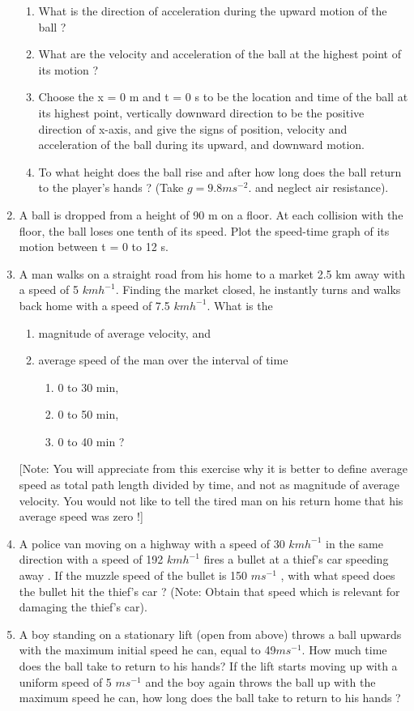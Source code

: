\begin{enumerate}[label=\arabic*.,ref=\thesection.\theenumi]
\begin{enumerate}
\item  What is the direction of acceleration during the upward motion of the ball ? 
\item  What are the velocity and acceleration of the ball at the highest point of its motion ?
\item  Choose the x = 0 m and t = 0 s to be the location and time of the ball at its highest point, vertically downward direction to be the positive direction of x-axis, and give the signs of position, velocity and acceleration of the ball during its upward, and downward motion.
\item  To what height does the ball rise and after how long does the ball return to the player's hands ? (Take $g = 9.8 m s^{-2}$.
and neglect air resistance).
\end{enumerate}
\item  A ball is dropped from a height of 90 m on a floor. At each collision with the floor, the ball loses one tenth of its speed. Plot the speed-time graph of its motion between t = 0 to 12 s.
\item A man walks on a straight road from his home to a market 2.5 km away with a speed of 5 $km h^{-1}$. Finding the market closed, he instantly turns and walks back home with a speed of 7.5 $km h^{-1}$. What is the 
\begin{enumerate}
\item magnitude of average velocity, and 
\item average speed of the man over the interval of time 
\begin{enumerate}
\item 0 to 30 min, 
\item 0 to 50 min, 
\item 0 to 40 min ? 
\end{enumerate}
\end{enumerate}
[Note: You will appreciate from this exercise why it is better to define average speed as total path length divided by time, and not as magnitude of average velocity. You would not like to tell the tired man on his return home that his average speed was zero !]
\item  A police van moving on a highway with a speed of 30 $km h^{-1}$
in the same direction with a speed of 192 $km h^{-1}$ 
fires a bullet at a thief's car speeding away . If the muzzle speed of the bullet is 150 $m s^{-1}$
, with
what speed does the bullet hit the thief's car ? (Note: Obtain that speed which is relevant for damaging the thief's car).
\item A boy standing on a stationary lift (open from above) throws a ball upwards with the maximum initial speed he can, equal to 49$ m s^{-1}$. How much time does the ball
take to return to his hands? If the lift starts moving up with a uniform speed of 5 $m s^{-1}$
and the boy again throws the ball up with the maximum speed he can, how
long does the ball take to return to his hands ? 


\end{enumerate}
